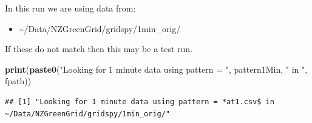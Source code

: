 \documentclass[]{article}
\newenvironment{Shaded}{\begin{snugshade}}{\end{snugshade}}
\newcommand{\KeywordTok}[1]{\textcolor[rgb]{0.13,0.29,0.53}{\textbf{#1}}}
\newcommand{\StringTok}[1]{\textcolor[rgb]{0.31,0.60,0.02}{#1}}
\newcommand{\NormalTok}[1]{#1}
\providecommand{\tightlist}{%
  \setlength{\itemsep}{0pt}\setlength{\parskip}{0pt}}
\begin{document}
In this run we are using data from:

\begin{itemize}
\tightlist
\item
  \textasciitilde{}/Data/NZGreenGrid/gridspy/1min\_orig/
\end{itemize}

If these do not match then this may be a test run.

\begin{Shaded}
\begin{Highlighting}[]
\KeywordTok{print}\NormalTok{(}\KeywordTok{paste0}\NormalTok{(}\StringTok{"Looking for 1 minute data using pattern = "}\NormalTok{, pattern1Min, }\StringTok{" in "}\NormalTok{, fpath))}
\end{Highlighting}
\end{Shaded}

\begin{verbatim}
## [1] "Looking for 1 minute data using pattern = *at1.csv$ in ~/Data/NZGreenGrid/gridspy/1min_orig/"
\end{verbatim}
\end{document}

